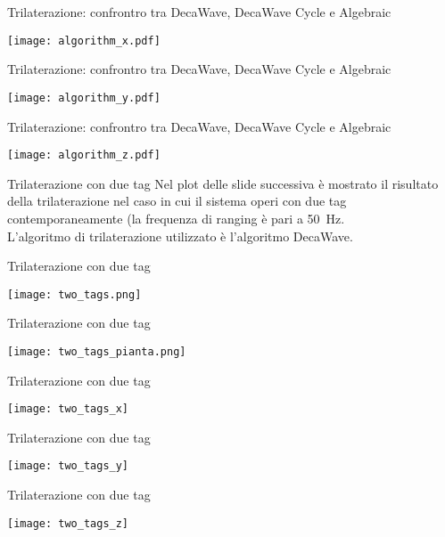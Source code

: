 \begin{frame}{Trilaterazione: confrontro tra DecaWave, DecaWave Cycle e Algebraic}
  \begin{center}
    \texttt{[image: algorithm\_x.pdf]}
  \end{center}
\end{frame}

\begin{frame}{Trilaterazione: confrontro tra DecaWave, DecaWave Cycle e Algebraic}
  \begin{center}
    \texttt{[image: algorithm\_y.pdf]}
  \end{center}
\end{frame}

\begin{frame}{Trilaterazione: confrontro tra DecaWave, DecaWave Cycle e Algebraic}
  \begin{center}
    \texttt{[image: algorithm\_z.pdf]}
  \end{center}
\end{frame}

\begin{frame}{Trilaterazione con due tag}
  Nel plot delle slide successiva è mostrato il risultato della trilaterazione nel caso in cui il sistema
  operi con due tag contemporaneamente (la frequenza di ranging è pari a \SI{50}{\hertz}.\\
  L'algoritmo di trilaterazione utilizzato è l'algoritmo DecaWave.
\end{frame}

\begin{frame}{Trilaterazione con due tag}
  \begin{center}
    \texttt{[image: two\_tags.png]}
  \end{center}
\end{frame}

\begin{frame}{Trilaterazione con due tag}
  \begin{center}
    \texttt{[image: two\_tags\_pianta.png]}
  \end{center}
\end{frame}

\begin{frame}{Trilaterazione con due tag}
  \begin{center}
    \texttt{[image: two\_tags\_x]}
  \end{center}
\end{frame}

\begin{frame}{Trilaterazione con due tag}
  \begin{center}
    \texttt{[image: two\_tags\_y]}
  \end{center}
\end{frame}

\begin{frame}{Trilaterazione con due tag}
  \begin{center}
    \texttt{[image: two\_tags\_z]}
  \end{center}
\end{frame}


